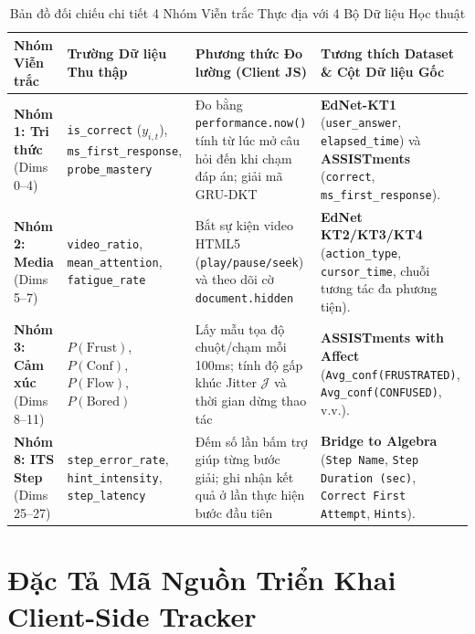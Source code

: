 \documentclass[11pt,a4paper]{article}
\begin{document}
\begin{table}[H]
  \centering\footnotesize
  \caption{Bản đồ đối chiếu chi tiết 4 Nhóm Viễn trắc Thực địa với 4 Bộ Dữ liệu Học thuật}\label{tab:mapping-datasets-4groups}
  \begin{tabularx}{\linewidth}{p{2.2cm} p{3.2cm} p{3.8cm} X}
    \toprule
    \textbf{Nhóm Viễn trắc} & \textbf{Trường Dữ liệu Thu thập} & \textbf{Phương thức Đo lường (Client JS)} & \textbf{Tương thích Dataset \& Cột Dữ liệu Gốc} \\
    \midrule
    \textbf{Nhóm 1: Tri thức} (Dims 0--4) & \texttt{is\_correct} ($y_{i, t}$), \texttt{ms\_first\_response}, \texttt{probe\_mastery} & Đo bằng \texttt{performance.now()} tính từ lúc mở câu hỏi đến khi chạm đáp án; giải mã GRU-DKT & \textbf{EdNet-KT1} (\texttt{user\_answer}, \texttt{elapsed\_time}) và \textbf{ASSISTments} (\texttt{correct}, \texttt{ms\_first\_response}). \\
    \addlinespace
    \textbf{Nhóm 2: Media} (Dims 5--7) & \texttt{video\_ratio}, \texttt{mean\_attention}, \texttt{fatigue\_rate} & Bắt sự kiện video HTML5 (\texttt{play/pause/seek}) và theo dõi cờ \texttt{document.hidden} & \textbf{EdNet KT2/KT3/KT4} (\texttt{action\_type}, \texttt{cursor\_time}, chuỗi tương tác đa phương tiện). \\
    \addlinespace
    \textbf{Nhóm 3: Cảm xúc} (Dims 8--11) & $P(\text{Frust})$, $P(\text{Conf})$, $P(\text{Flow})$, $P(\text{Bored})$ & Lấy mẫu tọa độ chuột/chạm mỗi 100ms; tính độ gấp khúc Jitter $\mathcal{J}$ và thời gian dừng thao tác & \textbf{ASSISTments with Affect} (\texttt{Avg\_conf(FRUSTRATED)}, \texttt{Avg\_conf(CONFUSED)}, v.v.). \\
    \addlinespace
    \textbf{Nhóm 8: ITS Step} (Dims 25--27) & \texttt{step\_error\_rate}, \texttt{hint\_intensity}, \texttt{step\_latency} & Đếm số lần bấm trợ giúp từng bước giải; ghi nhận kết quả ở lần thực hiện bước đầu tiên & \textbf{Bridge to Algebra} (\texttt{Step Name}, \texttt{Step Duration (sec)}, \texttt{Correct First Attempt}, \texttt{Hints}). \\
    \bottomrule
  \end{tabularx}
\end{table}

\section{Đặc Tả Mã Nguồn Triển Khai Client-Side Tracker}\label{sec:client-code}
\end{document}

